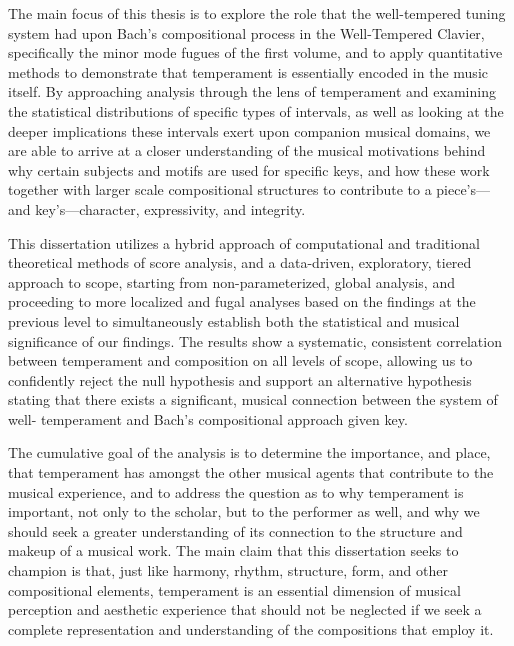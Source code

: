     
    
    

    
    The main focus of this thesis is to explore the role that the
well-tempered tuning system had upon Bach's compositional process in the
Well-Tempered Clavier, specifically the minor mode fugues of the first
volume, and to apply quantitative methods to demonstrate that
temperament is essentially encoded in the music itself. By approaching
analysis through the lens of temperament and examining the statistical
distributions of specific types of intervals, as well as looking at the
deeper implications these intervals exert upon companion musical
domains, we are able to arrive at a closer understanding of the musical
motivations behind why certain subjects and motifs are used for specific
keys, and how these work together with larger scale compositional
structures to contribute to a piece's---and key's---character,
expressivity, and integrity.

This dissertation utilizes a hybrid approach of computational and
traditional theoretical methods of score analysis, and a data-driven,
exploratory, tiered approach to scope, starting from non-parameterized,
global analysis, and proceeding to more localized and fugal analyses
based on the findings at the previous level to simultaneously establish
both the statistical and musical significance of our findings. The
results show a systematic, consistent correlation between temperament
and composition on all levels of scope, allowing us to confidently
reject the null hypothesis and support an alternative hypothesis stating
that there exists a significant, musical connection between the system
of well- temperament and Bach's compositional approach given key.

The cumulative goal of the analysis is to determine the importance, and
place, that temperament has amongst the other musical agents that
contribute to the musical experience, and to address the question as to
why temperament is important, not only to the scholar, but to the
performer as well, and why we should seek a greater understanding of its
connection to the structure and makeup of a musical work. The main claim
that this dissertation seeks to champion is that, just like harmony,
rhythm, structure, form, and other compositional elements, temperament
is an essential dimension of musical perception and aesthetic experience
that should not be neglected if we seek a complete representation and
understanding of the compositions that employ it.


    
    
    
